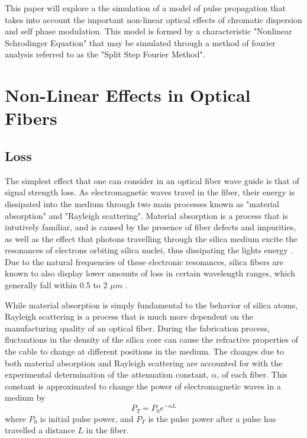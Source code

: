 \documentclass[10pt, a4paper, twocolumn]{article} %
\begin{document}
This paper will explore a the simulation of a model of pulse propagation that takes into account the important non-linear optical effects of chromatic dispersion and self phase modulation. This model is formed by a characteristic "Nonlinear Schrodinger Equation" that may be simulated through a method of fourier analysis referred to as the "Split Step Fourier Method".

\section{Non-Linear Effects in Optical Fibers}

\subsection{Loss}
The simplest effect that one can consider in an optical fiber wave guide is that of signal strength loss. As electromagnetic waves travel in the fiber, their energy is dissipated into the medium through two main processes known as "material absorption" and "Rayleigh scattering". Material absorption is a process that is intutively familiar, and is caused by the presence of fiber defects and impurities, as well as the effect that photons travelling through the silica medium excite the resonances of electrons orbiting silica nuclei, thus dissipating the lights energy \cite{AgrawalChap1}. Due to the natural frequencies of these electronic resonances, silica fibers are known to also display lower amounts of loss in certain wavelength ranges, which generally fall within 0.5 to 2 $\mu m$ \cite{AgrawalChap1}. 

While material absorption is simply fundamental to the behavior of silica atoms, Rayleigh scattering is a process that is much more dependent on the manufacturing quality of an optical fiber. During the fabrication process, fluctuations in the density of the silica core can cause the refractive properties of the cable to change at different positions in the medium. The changes due to both material absorption and Rayleigh scattering are accounted for with the experimental determination of the attenuation constant, $\alpha$, of each fiber. This constant is approximated to change the power of electromagnetic waves in a medium by 
$$P_T = P_0 e^{-\alpha L}$$
where $P_0$ is initial pulse power, and $P_T$ is the pulse power after a pulse has travelled a distance $L$ in the fiber.
\end{document}
